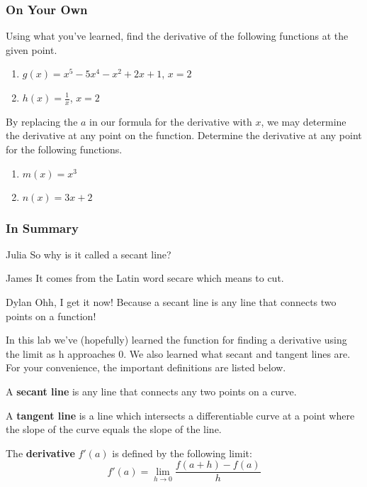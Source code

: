 \documentclass{ximera}
\begin{document}
\subsubsection{On Your Own}
Using what you've learned, find the derivative of the following functions at the given point.
\begin{enumerate}
\item{$g(x) = x^5-5x^4-x^2+2x+1$, $x=2$}
\item{$h(x) = \frac{1}{x}$, $x=2$}
\end{enumerate}
By replacing the $a$ in our formula for the derivative with $x$, we may determine the derivative at any point on the function. Determine the derivative at any point for the following functions.
\begin{enumerate}
\item{$m(x) = x^3$}
\item{$n(x) = 3x+2$}
\end{enumerate}


\subsubsection{In Summary}
\begin{dialogue}
\item[Julia] So why is it called a secant line?
\item[James] It comes from the Latin word secare which means to cut.
\item[Dylan] Ohh, I get it now! Because a secant line is any line that connects two points on a function!
\end{dialogue}
In this lab we've (hopefully) learned the function for finding a derivative using the limit as h approaches 0. We also learned what secant and tangent lines are. For your convenience, the important definitions are listed below. 
\begin{definition}
 A \textbf{secant line} is any line that connects any two points on a curve.
\end{definition}
\begin{definition}
A \textbf{tangent line} is a line which intersects a differentiable curve at a point where the slope of the curve equals the slope of the line.
\end{definition}
\begin{definition}
The \textbf{derivative} $f'(a)$ is defined by the following limit:
$$f'(a)=\displaystyle \lim_{h\rightarrow 0} \frac{f(a+h)-f(a)}{h}$$
\end{definition}
\end{document}
